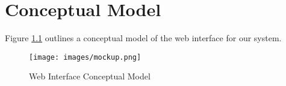 \chapter{Conceptual Model}

Figure \ref{fig:mockup} outlines a conceptual model of the web interface for our system.

\begin{figure}[h]
	\centering
\texttt{[image: images/mockup.png]}
	\caption{Web Interface Conceptual Model}
	\label{fig:mockup}
\end{figure}